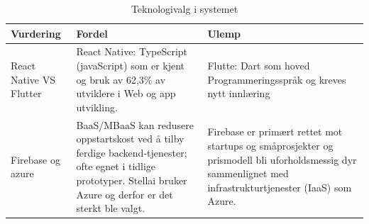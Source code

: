 \begin{table}[h]
\label{tab:teknologivalg}

\renewcommand{\arraystretch}{1.3}

\begin{tabularx}{\textwidth}{|>{\raggedright\arraybackslash}p{4.1cm}
                            |>{\raggedright\arraybackslash}X
                            |>{\raggedright\arraybackslash}X|}

\hline
\rowcolor{uialightgold}
\textbf{Vurdering} & 
\textbf{Fordel} & 
\textbf{Ulemp} \\
\hline
React Native VS Flutter&
React Native: TypeScript (javaScript) som er kjent og bruk av 62,3\% av utviklere i Web og app utvikling. &
Flutte: Dart som hoved Programmeringsspråk og kreves nytt innlæring \\
\hline
Firebase og azure &
BaaS/MBaaS kan redusere oppstartskost ved å tilby ferdige backend-tjenester; ofte egnet i tidlige prototyper. Stellai bruker Azure og derfor er det sterkt ble valgt.&
Firebase er primært rettet mot startups og småprosjekter og prismodell bli uforholdsmessig dyr sammenlignet med infrastrukturtjenester (IaaS) som Azure.\\
\hline
\end{tabularx}


\caption{Teknologivalg i systemet}
\label{tab:teknologivalg}
\end{table}




